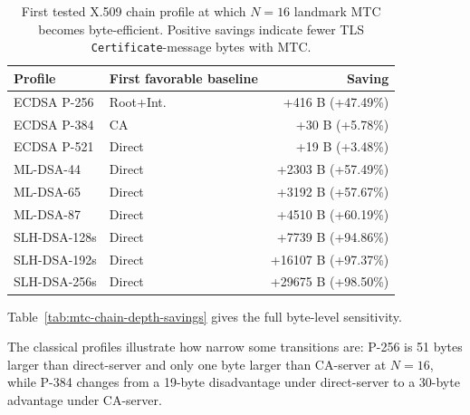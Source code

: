 \documentclass[journal]{IEEEtran}
\begin{document}
\begin{table}[t]

\centering

\caption{First tested X.509 chain profile at which $N=16$ landmark MTC becomes byte-efficient. Positive savings indicate fewer TLS \texttt{Certificate}-message bytes with MTC.}

\label{tab:mtc-chain-depth-crossover}

\begin{tabular}{llr}

\toprule

\textbf{Profile} & \textbf{First favorable baseline} & \textbf{Saving} \\

\midrule

ECDSA P-256   & Root+Int. & +416 B (+47.49\%) \\

ECDSA P-384   & CA        & +30 B (+5.78\%) \\

ECDSA P-521   & Direct    & +19 B (+3.48\%) \\

ML-DSA-44     & Direct    & +2303 B (+57.49\%) \\

ML-DSA-65     & Direct    & +3192 B (+57.67\%) \\

ML-DSA-87     & Direct    & +4510 B (+60.19\%) \\

SLH-DSA-128s  & Direct    & +7739 B (+94.86\%) \\

SLH-DSA-192s  & Direct    & +16107 B (+97.37\%) \\

SLH-DSA-256s  & Direct    & +29675 B (+98.50\%) \\

\bottomrule

\end{tabular}

\end{table}



Table~\ref{tab:mtc-chain-depth-savings} gives the full byte-level sensitivity.

The classical profiles illustrate how narrow some transitions are: P-256 is 51 bytes larger than direct-server and only one byte larger than CA-server at $N=16$, while P-384 changes from a 19-byte disadvantage under direct-server to a 30-byte advantage under CA-server.
\end{document}
